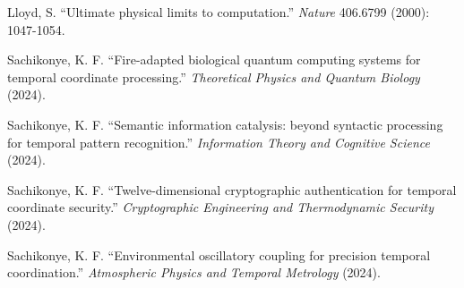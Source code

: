 \documentclass[11pt]{article}
\theoremstyle{remark}
\begin{document}
\begin{thebibliography}{99}
Lloyd, S. ``Ultimate physical limits to computation.'' \textit{Nature} 406.6799 (2000): 1047-1054.

Sachikonye, K. F. ``Fire-adapted biological quantum computing systems for temporal coordinate processing.'' \textit{Theoretical Physics and Quantum Biology} (2024).

Sachikonye, K. F. ``Semantic information catalysis: beyond syntactic processing for temporal pattern recognition.'' \textit{Information Theory and Cognitive Science} (2024).

Sachikonye, K. F. ``Twelve-dimensional cryptographic authentication for temporal coordinate security.'' \textit{Cryptographic Engineering and Thermodynamic Security} (2024).

Sachikonye, K. F. ``Environmental oscillatory coupling for precision temporal coordination.'' \textit{Atmospheric Physics and Temporal Metrology} (2024).

\end{thebibliography}
\end{document}
